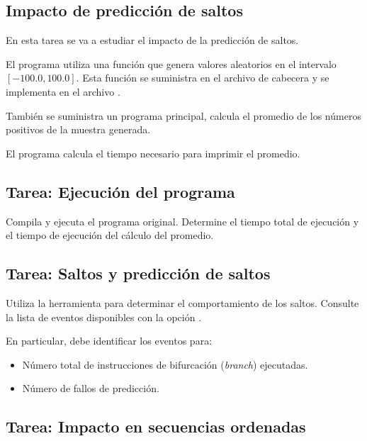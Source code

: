 \clearpage
\subsection{Impacto de predicción de saltos}

En esta tarea se va a estudiar el impacto de la predicción de saltos.

El programa utiliza una función que genera valores aleatorios en el intervalo
$[-100.0, 100.0]$. Esta función se suministra en el archivo de cabecera
 y se implementa en el archivo .





También se suministra un programa principal, calcula el promedio de los números
positivos de la muestra generada.



El programa calcula el tiempo necesario para imprimir el promedio.

\subsection{Tarea: Ejecución del programa}

Compila y ejecuta el programa original. Determine el tiempo total de ejecución y
el tiempo de ejecución del cálculo del promedio.

\subsection{Tarea: Saltos y predicción de saltos}

Utiliza la herramienta  para determinar el comportamiento de los saltos.
Consulte la lista de eventos disponibles con la opción . 

En particular, debe identificar los eventos para:
\begin{itemize}
  \item Número total de instrucciones de bifurcación (\emph{branch}) ejecutadas.
  \item Número de fallos de predicción.
\end{itemize}

\subsection{Tarea: Impacto en secuencias ordenadas}

